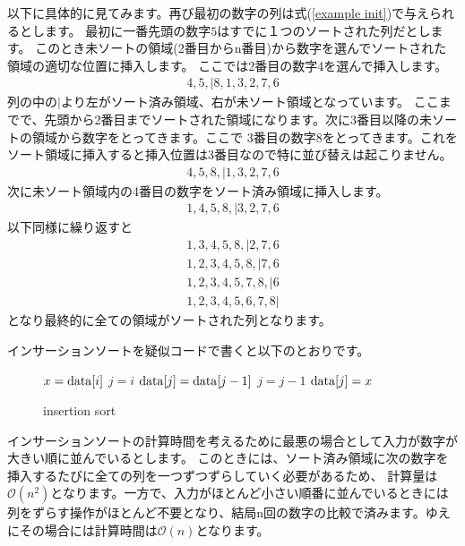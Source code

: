 \documentclass[dvipdfmx]{jarticle}
\begin{document}
以下に具体的に見てみます。再び最初の数字の列は式(\ref{example init})で与えられるとします。
最初に一番先頭の数字$5$はすでに１つのソートされた列だとします。
このとき未ソートの領域(2番目からn番目)から数字を選んでソートされた領域の適切な位置に挿入します。
ここでは2番目の数字4を選んで挿入します。
\begin{eqnarray}
4, 5,| 8, 1, 3, 2, 7, 6
\end{eqnarray}
列の中の$|$より左がソート済み領域、右が未ソート領域となっています。
ここまでで、先頭から2番目までソートされた領域になります。次に3番目以降の未ソートの領域から数字をとってきます。ここで
3番目の数字8をとってきます。これをソート領域に挿入すると挿入位置は3番目なので特に並び替えは起こりません。
\begin{eqnarray}
4, 5, 8,| 1, 3, 2, 7, 6
\end{eqnarray}
次に未ソート領域内の4番目の数字をソート済み領域に挿入します。
\begin{eqnarray}
1, 4, 5, 8,| 3, 2, 7, 6
\end{eqnarray}
以下同様に繰り返すと
\begin{eqnarray}
1, 3, 4, 5, 8,| 2, 7, 6\\
1, 2, 3, 4, 5, 8,| 7, 6\\
1, 2, 3, 4, 5, 7, 8,| 6\\
1, 2, 3, 4, 5, 6, 7, 8|
\end{eqnarray}
となり最終的に全ての領域がソートされた列となります。

インサーションソートを疑似コードで書くと以下のとおりです。
\begin{figure}[H]
\begin{algorithm}[H]
	\caption{insertion sort}
	\label{insertion sort}
	\begin{algorithmic}[1]  
	\STATE $x={\rm data}[i]$
	\STATE $j=i$
    	\STATE ${\rm data}[j] = {\rm data}[j-1]$
	\STATE $j = j-1$
	\ENDWHILE
	\STATE ${\rm data}[j] = x$
	\ENDFOR
	\end{algorithmic}
\end{algorithm}
\end{figure}
インサーションソートの計算時間を考えるために最悪の場合として入力が数字が大きい順に並んでいるとします。
このときには、ソート済み領域に次の数字を挿入するたびに全ての列を一つずつずらしていく必要があるため、
計算量は$\mathcal{O}(n^{2})$となります。一方で、入力がほとんど小さい順番に並んでいるときには
列をずらす操作がほとんど不要となり、結局n回の数字の比較で済みます。ゆえにその場合には計算時間は$\mathcal{O}(n)$となります。
\end{document}
